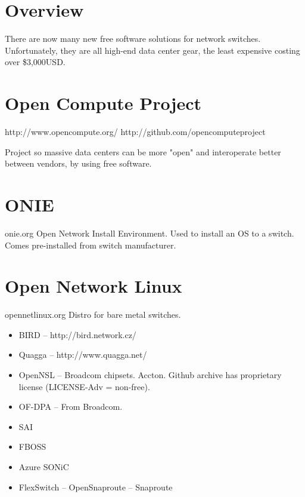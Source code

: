 %
%
%
%
%

\section{Overview}
There are now many new free software solutions for network switches.
Unfortunately, they are all high-end data center gear, the least expensive
costing over \$3,000USD.

\section{Open Compute Project}
http://www.opencompute.org/  http://github.com/opencomputeproject


Project so massive data centers can be more "open" and interoperate better
between vendors, by using free software.

\section{ONIE}
onie.org
Open Network Install Environment.
Used to install an OS to a switch. Comes pre-installed from switch manufacturer.

\section{Open Network Linux}
opennetlinux.org
Distro for bare metal switches.

\begin{itemize}
 \item BIRD -- http://bird.network.cz/
 \item Quagga -- http://www.quagga.net/
 \item OpenNSL -- Broadcom chipsets. Accton. Github archive has proprietary
   license (LICENSE-Adv = non-free).
 \item OF-DPA -- From Broadcom.
 \item SAI 
 \item FBOSS
 \item Azure SONiC
 \item FlexSwitch -- OpenSnaproute -- Snaproute
\end{itemize}

